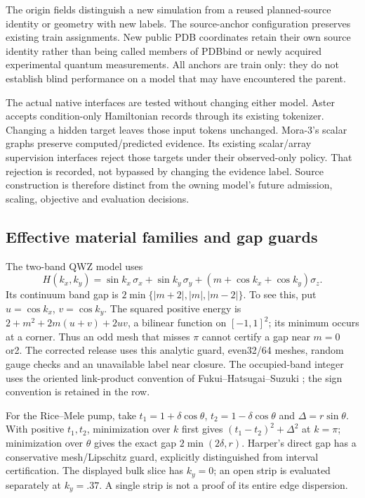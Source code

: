 \documentclass[11pt]{article}
\theoremstyle{definition}\newtheorem{definition}[theorem]{Definition}
\theoremstyle{remark}\newtheorem{remark}[theorem]{Remark}
\begin{document}
The origin fields distinguish a new simulation from a reused planned-source
identity or geometry with new labels. The source-anchor configuration preserves
existing train assignments. New public PDB coordinates retain their own source
identity rather than being called members of PDBbind or newly acquired
experimental quantum measurements. All anchors are train only: they do not
establish blind performance on a model that may have encountered the parent.

The actual native interfaces are tested without changing either model.
Aster accepts condition-only Hamiltonian records through its existing tokenizer.
Changing a hidden target leaves those input tokens unchanged. Mora-3's scalar
graphs preserve computed/predicted evidence. Its existing scalar/array
supervision interfaces reject those targets under their observed-only policy.
That rejection is recorded, not bypassed by changing the evidence label.
Source construction is therefore distinct from the owning model's future
admission, scaling, objective and evaluation decisions.

\subsection{Effective material families and gap guards}
The two-band QWZ model uses
\[
 H(k_x,k_y)=\sin k_x\,\sigma_x+\sin k_y\,\sigma_y
 +(m+\cos k_x+\cos k_y)\sigma_z.
\]
Its continuum band gap is
$2\min\{|m+2|,|m|,|m-2|\}$. To see this, put
$u=\cos k_x$, $v=\cos k_y$. The squared positive energy is
$2+m^2+2m(u+v)+2uv$, a bilinear function on $[-1,1]^2$;
its minimum occurs at a corner. Thus an odd mesh that misses $\pi$ cannot
certify a gap near $m=0$ or2. The corrected release uses this analytic guard,
even32/64 meshes, random gauge checks and an unavailable label near closure.
The occupied-band integer uses the oriented link-product convention of
Fukui--Hatsugai--Suzuki \cite{DSFHS}; the sign convention is retained in the row.

For the Rice--Mele pump, take
$t_1=1+\delta\cos\theta$, $t_2=1-\delta\cos\theta$ and
$\Delta=r\sin\theta$. With positive $t_1,t_2$, minimization over $k$ first
gives $(t_1-t_2)^2+\Delta^2$ at $k=\pi$; minimization over $\theta$ gives
the exact gap $2\min(2\delta,r)$. Harper's direct gap has a conservative
mesh/Lipschitz guard, explicitly distinguished from interval certification.
The displayed bulk slice has $k_y=0$; an open strip is evaluated separately at
$k_y=.37$. A single strip is not a proof of its entire edge dispersion.
\end{document}
